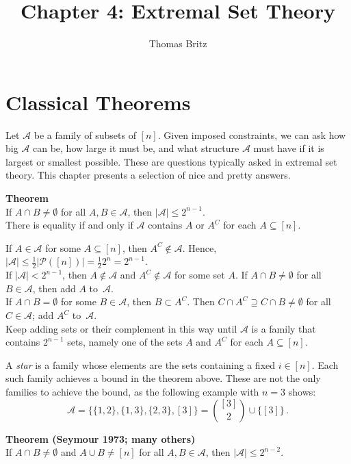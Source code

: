 \documentclass[a4paper]{article}
\title{\Large\sc Chapter 4: Extremal Set Theory}
\author{Thomas Britz}
\date{}
\let\oldendproof\endproof
\renewenvironment{proof}[1][\proofname]{%
  \oldproof[\scshape \noindent {\bfseries \text{Proof}}]%
}{\oldendproof}
\newcommand{\example} {\bigskip\noindent{\bf Example.}\;\;}
\newenvironment{thm}[1]{
	\begin{framed}
	\noindent
	{\bfseries #1}\\}{\setlength{\itemsep}{0pt}
	\end{framed}
}
\newcommand{\Af}{\mathcal{A}}
\newcommand{\Pf}{\mathcal{P}}
\begin{document}
\maketitle
{}


\section*{Classical Theorems}

Let $\Af$ be a family of subsets of $[n]$.
Given imposed constraints, we can ask how big $\Af$ can be, how large it must be,
and what structure $\Af$ must have if it is largest or smallest possible.
These are questions typically asked in extremal set theory.
This chapter presents a selection of nice and pretty answers.


\begin{thm}{Theorem}
If $A \cap B \neq \emptyset$ for all $A,B \in \Af$, then $|\Af| \leq 2^{n-1}$.\\
There is equality if and only if $\Af$ contains $A$ or $A^C$ for each $A \subseteq [n]$.
\end{thm}

\begin{proof}
If $A \in \Af$ for some $A \subseteq [n]$, then $A^C \not\in \Af$.
Hence, $|\Af|\leq \frac{1}{2} |\Pf([n])| = \frac{1}{2} 2^n = 2^{n-1}$.\\
If $|\Af| < 2^{n-1}$, then $A \not\in \Af$ and $A^C \not\in \Af$ for some set $A$.
If $A\cap B \neq \emptyset$ for all $B \in \Af$, then add $A$ to~$\Af$.\\
If $A \cap B = \emptyset$ for some $B \in \Af$, then $B \subset A^C$.
Then $C \cap A^C\supseteq C \cap B \neq \emptyset$ for all $C \in \Af$; add $A^C$ to~$\Af$.\\
Keep adding sets or their complement in this way until $\Af$ is a family that contains $2^{n-1}$ sets,
namely one of the sets $A$ and $A^C$ for each $A \subseteq [n]$.
\end{proof}

\example
A \emph{star} is a family whose elements are the sets containing a fixed $i \in [n]$.
Each such family achieves a bound in the theorem above.
These are not the only families to achieve the bound, as the following example with $n = 3$ shows:
\[
  \Af = \big\{\{1,2\}, \{1,3\}, \{2,3\}, [3]\big\} = \binom{[3]}{2} \cup \{[3]\}\,.
\]

\begin{thm}{Theorem (Seymour 1973; many others)}
If $A \cap B \neq \emptyset$ and $A \cup B \neq [n]$ for all $A,B \in \Af$,
then $|\Af| \leq 2^{n-2}$.
\end{thm}
\end{document}
